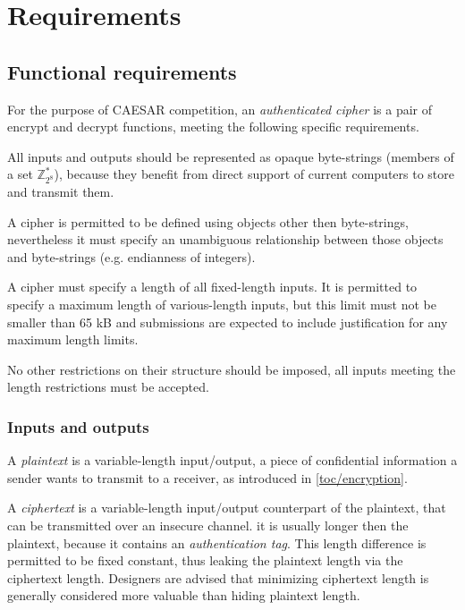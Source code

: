 \section{Requirements}

\subsection{Functional requirements}

For the purpose of CAESAR competition, an \textit{authenticated cipher} is a pair of encrypt and decrypt functions, meeting the following specific requirements.

All inputs and outputs should be represented as opaque byte-strings (members of a set $\mathbb{Z}_{2^8}^*$), because they benefit from direct support of current computers to store and transmit them.

A cipher is permitted to be defined using objects other then byte-strings, nevertheless it must specify an unambiguous relationship between those objects and byte-strings (e.g. endianness of integers).

A cipher must specify a length of all fixed-length inputs. It is permitted to specify a maximum length of various-length inputs, but this limit must not be smaller than 65 kB and submissions are expected to include justification for any maximum length limits.

No other restrictions on their structure should be imposed, all inputs meeting the length restrictions must be accepted.

\subsubsection{Inputs and outputs}



A \textit{plaintext} is a variable-length input/output, a piece of confidential information a sender wants to transmit to a receiver, as introduced in \autoref{toc/encryption}.

A \textit{ciphertext} is a variable-length input/output counterpart of the plaintext, that can be transmitted over an insecure channel. it is usually longer then the plaintext, because it contains an \textit{authentication tag}. This length difference is permitted to be fixed constant, thus leaking the plaintext length via the ciphertext length. Designers are advised that minimizing ciphertext length is generally considered more valuable than hiding plaintext length.

